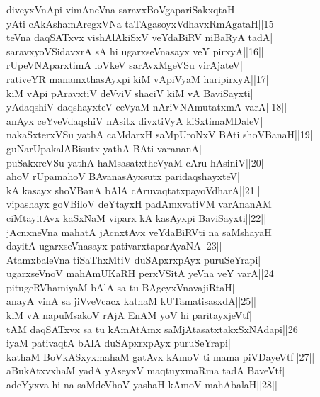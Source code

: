 \documentclass{article}
\begin{document}
diveyxVnApi vimAneVna saravxBoVgapariSakxqtaH|\\
yAti cAkAshamAregxVNa taTAgasoyxVdhavxRmAgataH||15||\\
teVna daqSATxvx vishAlAkiSxV veYdaBiRV niBaRyA tadA|\\
saravxyoVSidavxrA sA hi ugarxseVnasayx veY pirxyA||16||\\
rUpeVNAparxtimA loVkeV sarAvxMgeVSu virAjateV|\\
rativeYR manamxthasAyxpi kiM vApiVyaM haripirxyA||17||\\
kiM vApi pAravxtiV deVviV shaciV kiM vA BaviSayxti|\\
yAdaqshiV daqshayxteV ceVyaM nAriVNAmutatxmA varA||18||\\
anAyx ceYveVdaqshiV nAsitx divxtiVyA kiSxtimaMDaleV|\\
nakaSxterxVSu yathA caMdarxH saMpUroNxV BAti shoVBanaH||19||\\
guNarUpakalABisutx yathA BAti varananA|\\
puSakxreVSu yathA haMsasatxtheVyaM cAru hAsiniV||20||\\
ahoV rUpamahoV BAvanasAyxsutx paridaqshayxteV|\\
kA kasayx shoVBanA bAlA cAruvaqtatxpayoVdharA||21||\\
vipashayx goVBiloV deYtayxH padAmxvatiVM varAnanAM|\\
ciMtayitAvx kaSxNaM viparx kA kasAyxpi BaviSayxti||22||\\
jAcnxneVna mahatA jAcnxtAvx veYdaBiRVti na saMshayaH|\\
dayitA ugarxseVnasayx pativarxtaparAyaNA||23||\\
AtamxbaleVna tiSaThxMtiV duSApxrxpAyx puruSeYrapi|\\
ugarxseVnoV mahAmUKaRH perxVSitA yeVna veY varA||24||\\
pitugeRVhamiyaM bAlA sa tu BAgeyxVnavajiRtaH|\\
anayA vinA sa jiVveVcacx kathaM kUTamatisasxdA||25||\\
kiM vA napuMsakoV rAjA EnAM yoV hi paritayxjeVtf|\\
tAM daqSATxvx sa tu kAmAtAmx saMjAtasatxtakxSxNAdapi||26||\\
iyaM pativaqtA bAlA duSApxrxpAyx puruSeYrapi|\\
kathaM BoVkASxyxmahaM gatAvx kAmoV ti mama piVDayeVtf||27||\\
aBukAtxvxhaM yadA yAseyxV maqtuyxmaRma tadA BaveVtf|\\
adeYyxva hi na saMdeVhoV yashaH kAmoV mahAbalaH||28||\\
\end{document}
